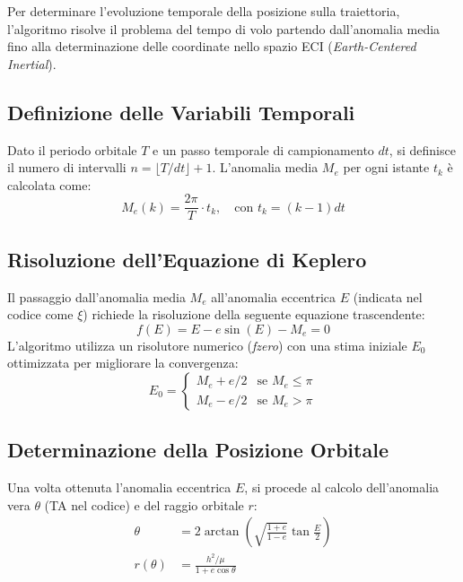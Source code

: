 \documentclass[12pt, a4paper]{article}
\begin{document}
Per determinare l'evoluzione temporale della posizione sulla traiettoria, l'algoritmo risolve il problema del tempo di volo partendo dall'anomalia media fino alla determinazione delle coordinate nello spazio ECI (\textit{Earth-Centered Inertial}).

\subsection{Definizione delle Variabili Temporali}
Dato il periodo orbitale $T$ e un passo temporale di campionamento $dt$, si definisce il numero di intervalli $n = \lfloor T/dt \rfloor + 1$. L'anomalia media $M_e$ per ogni istante $t_k$ è calcolata come:
\begin{equation}
    M_e(k) = \frac{2\pi}{T} \cdot t_k, \quad \text{con } t_k = (k-1)dt
\end{equation}

\subsection{Risoluzione dell'Equazione di Keplero}
Il passaggio dall'anomalia media $M_e$ all'anomalia eccentrica $E$ (indicata nel codice come $\xi$) richiede la risoluzione della seguente equazione trascendente:
\begin{equation}
    f(E) = E - e \sin(E) - M_e = 0
\end{equation}
L'algoritmo utilizza un risolutore numerico (\textit{fzero}) con una stima iniziale $E_0$ ottimizzata per migliorare la convergenza:
\begin{equation}
    E_0 = 
    \begin{cases} 
    M_e + e/2 & \text{se } M_e \leq \pi \\
    M_e - e/2 & \text{se } M_e > \pi
    \end{cases}
\end{equation}

\subsection{Determinazione della Posizione Orbitale}
Una volta ottenuta l'anomalia eccentrica $E$, si procede al calcolo dell'anomalia vera $\theta$ (TA nel codice) e del raggio orbitale $r$:
\begin{align}
    \theta &= 2 \arctan \left( \sqrt{\frac{1+e}{1-e}} \tan\frac{E}{2} \right) \\
    r(\theta) &= \frac{h^2/\mu}{1 + e \cos \theta}
\end{align}
\end{document}
